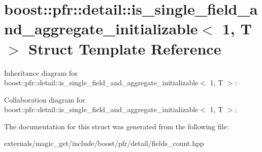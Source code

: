 \hypertarget{structboost_1_1pfr_1_1detail_1_1is__single__field__and__aggregate__initializable_3_011_00_01_t_01_4}{}\section{boost\+:\+:pfr\+:\+:detail\+:\+:is\+\_\+single\+\_\+field\+\_\+and\+\_\+aggregate\+\_\+initializable$<$ 1, T $>$ Struct Template Reference}
\label{structboost_1_1pfr_1_1detail_1_1is__single__field__and__aggregate__initializable_3_011_00_01_t_01_4}


Inheritance diagram for boost\+:\+:pfr\+:\+:detail\+:\+:is\+\_\+single\+\_\+field\+\_\+and\+\_\+aggregate\+\_\+initializable$<$ 1, T $>$\+:


Collaboration diagram for boost\+:\+:pfr\+:\+:detail\+:\+:is\+\_\+single\+\_\+field\+\_\+and\+\_\+aggregate\+\_\+initializable$<$ 1, T $>$\+:


The documentation for this struct was generated from the following file\+:\begin{DoxyCompactItemize}
\item 
externals/magic\+\_\+get/include/boost/pfr/detail/fields\+\_\+count.\+hpp\end{DoxyCompactItemize}

